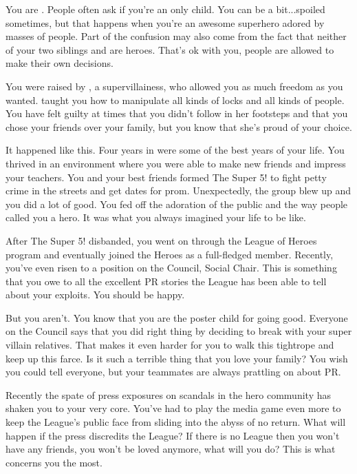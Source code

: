 \documentclass[char]{LRSguildcamp1}
\begin{document}
\name{\cYoungest{}}

You are \cYoungest {\intro}. People often ask if you're an only child. You can be a bit...spoiled sometimes, but that happens when you're an awesome superhero adored by masses of people. Part of the confusion may also come from the fact that neither of your two siblings \cOldest{} and \cArchitect{} are heroes. That's ok with you, people are allowed to make their own decisions.  

You were raised by \cGrandma{\MYsupername}, a supervillainess, who allowed you as much freedom as you wanted. \cGrandma{} taught you how to manipulate all kinds of locks and all kinds of people. You have felt guilty at times that you didn't follow in her footsteps and that you chose your friends over your family, but you know that she's proud of your choice. 

It happened like this. Four years in \pSuperSchool{} were some of the best years of your life. You thrived in an environment where you were able to make new friends and impress your teachers. You and your best friends formed The Super 5! to fight petty crime in the streets and get dates for prom. Unexpectedly, the group blew up and you did a lot of good. You fed off the adoration of the public and the way people called you a hero. It was what you always imagined your life to be like.  
 
After The Super 5! disbanded, you went on through the League of Heroes program and eventually joined the Heroes as a full-fledged member. Recently, you've even risen to a position on the Council, Social Chair. This is something that you owe to all the excellent PR stories the League has been able to tell about your exploits. You should be happy. 

But you aren't. You know that you are the poster child for going good. Everyone on the Council says that you did right thing by deciding to break with your super villain relatives. That makes it even harder for you to walk this tightrope and keep up this farce. Is it such a terrible thing that you love your family? 
You wish you could tell everyone, but your teammates are always prattling on about PR. 

Recently the spate of press exposures on scandals in the hero community has shaken you to your very core. You've had to play the media game even more to keep the League's public face from sliding into the abyss of no return. What will happen if the press discredits the League? If there is no League then you won't have any friends, you won't be loved anymore, what will you do? This is what concerns you the most. 
\end{document}
